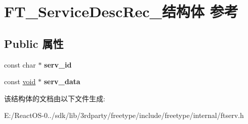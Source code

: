 \hypertarget{struct_f_t___service_desc_rec__}{}\section{F\+T\+\_\+\+Service\+Desc\+Rec\+\_\+结构体 参考}
\label{struct_f_t___service_desc_rec__}
\subsection*{Public 属性}
\begin{DoxyCompactItemize}
\item 
\mbox{\label{struct_f_t___service_desc_rec___ab706270db01e1398233571f10bd249d4}} 
const char $\ast$ {\bfseries serv\+\_\+id}
\item 
\mbox{\label{struct_f_t___service_desc_rec___aa597a33a2b0d099ec32882dc6aa38d59}} 
const \hyperlink{interfacevoid}{void} $\ast$ {\bfseries serv\+\_\+data}
\end{DoxyCompactItemize}


该结构体的文档由以下文件生成\+:\begin{DoxyCompactItemize}
\item 
E\+:/\+React\+O\+S-\/0../sdk/lib/3rdparty/freetype/include/freetype/internal/ftserv.\+h\end{DoxyCompactItemize}
